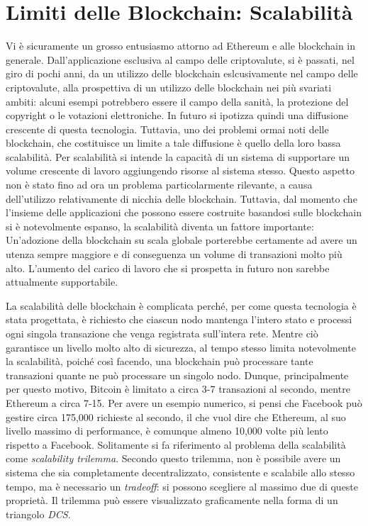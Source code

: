 \section{Limiti delle Blockchain: Scalabilità}

Vi è sicuramente un grosso entusiasmo attorno ad Ethereum e alle blockchain in generale. Dall'applicazione esclusiva al campo delle criptovalute, si è passati, nel giro di pochi anni, da un utilizzo delle blockchain eslcusivamente nel campo delle criptovalute, alla prospettiva di un utilizzo delle blockchain nei più svariati ambiti: alcuni esempi potrebbero essere il campo della sanità, la protezione del copyright o le votazioni elettroniche. In futuro si ipotizza quindi una diffusione crescente di questa tecnologia. Tuttavia, uno dei problemi ormai noti delle blockchain, che costituisce un limite a tale diffusione è quello della loro bassa scalabilità. Per scalabilità si intende la capacità di un sistema di supportare un volume crescente di lavoro aggiungendo risorse al sistema stesso. Questo aspetto non è stato fino ad ora un problema particolarmente rilevante, a causa dell'utilizzo relativamente di nicchia delle blockchain. Tuttavia, dal momento che l'insieme delle applicazioni che possono essere costruite basandosi sulle blockchain si è notevolmente espanso, la scalabilità diventa un fattore importante: Un'adozione della blockchain su scala globale porterebbe certamente ad avere un utenza sempre maggiore e di conseguenza un volume di transazioni molto più alto. L'aumento del carico di lavoro che si prospetta in futuro non sarebbe attualmente supportabile.

La scalabilità delle blockchain è complicata perché, per come questa tecnologia è stata progettata, è richiesto che ciascun nodo mantenga l'intero stato e processi ogni singola transazione che venga registrata sull'intera rete. Mentre ciò garantisce un livello molto alto di sicurezza, al tempo stesso limita notevolmente la scalabilità, poiché così facendo, una blockchain può processare tante transazioni quante ne può processare un singolo nodo. Dunque, principalmente per questo motivo, Bitcoin è limitato a circa 3-7 transazioni al secondo, mentre Ethereum a circa 7-15. Per avere un esempio numerico, si pensi che Facebook può gestire circa 175,000 richieste al secondo, il che vuol dire che Ethereum, al suo livello massimo di performance, è comunque almeno 10,000 volte più lento rispetto a Facebook. 
Solitamente si fa riferimento al problema della scalabilità come \textit{scalability trilemma}. Secondo questo trilemma, non è possibile avere un sistema che sia completamente decentralizzato, consistente e scalabile allo stesso tempo, ma è necessario un \textit{tradeoff}: si possono scegliere al massimo due di queste proprietà. Il trilemma può essere visualizzato graficamente nella forma di un triangolo \textit{DCS}.

